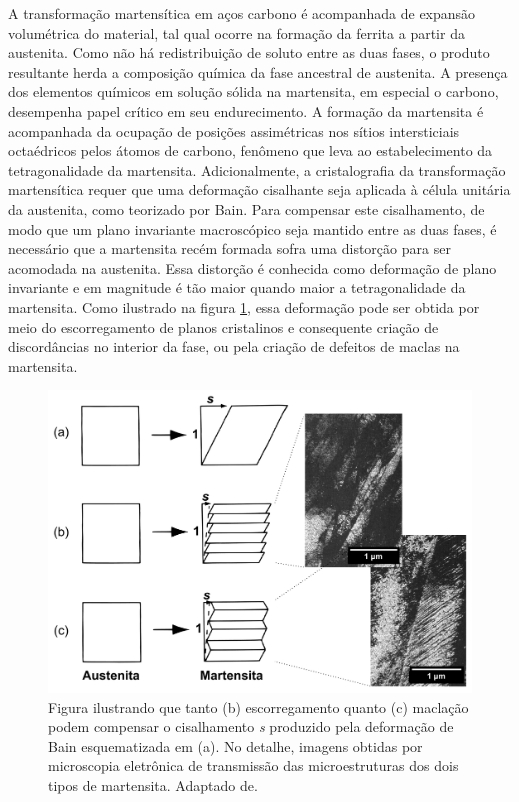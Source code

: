 A transformação martensítica em aços carbono é acompanhada de expansão volumétrica do material, tal qual ocorre na formação da ferrita a partir da austenita. Como não há redistribuição de soluto entre as duas fases, o produto resultante herda a composição química da fase ancestral de austenita. A presença dos elementos químicos em solução sólida na martensita, em especial o carbono, desempenha papel crítico em seu endurecimento. A formação da martensita é acompanhada da ocupação de posições assimétricas nos sítios intersticiais octaédricos pelos átomos de carbono, fenômeno que leva ao estabelecimento da tetragonalidade da martensita\cite{Zener1946,Hillert1986}. Adicionalmente, a cristalografia da transformação martensítica requer que uma deformação cisalhante seja aplicada à célula unitária da austenita, como teorizado por Bain\cite{Bain1924}. Para compensar este cisalhamento, de modo que um plano invariante macroscópico seja mantido entre as duas fases, é necessário que a martensita recém formada sofra uma distorção para ser acomodada na austenita. Essa distorção é conhecida como deformação de plano invariante\cite{Honeycombe2006} e em magnitude é tão maior quando maior a tetragonalidade da martensita. Como ilustrado na figura \ref{fig:cisMartensita}, essa deformação pode ser obtida por meio do escorregamento de planos cristalinos e consequente criação de discordâncias no interior da fase, ou pela criação de defeitos de maclas na martensita.

\begin{figure}
	\includegraphics[width=14cm]{img/shearMartensite.pdf}
	\caption{Figura ilustrando que tanto (b) escorregamento quanto (c) maclação podem compensar o cisalhamento \textit{s} produzido pela deformação de Bain esquematizada em (a). No detalhe, imagens obtidas por microscopia eletrônica de transmissão das microestruturas dos dois tipos de martensita. Adaptado de\cite{Porter2009}.}
	\label{fig:cisMartensita}
\end{figure}

